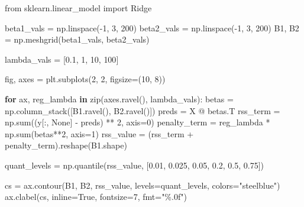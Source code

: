 \documentclass[
  letterpaper,
  DIV=11,
  numbers=noendperiod]{scrreprt}
\newenvironment{Shaded}{\begin{snugshade}}{\end{snugshade}}
\newcommand{\BuiltInTok}[1]{\textcolor[rgb]{0.00,0.23,0.31}{#1}}
\newcommand{\ControlFlowTok}[1]{\textcolor[rgb]{0.00,0.23,0.31}{\textbf{#1}}}
\newcommand{\DecValTok}[1]{\textcolor[rgb]{0.68,0.00,0.00}{#1}}
\newcommand{\FloatTok}[1]{\textcolor[rgb]{0.68,0.00,0.00}{#1}}
\newcommand{\ImportTok}[1]{\textcolor[rgb]{0.00,0.46,0.62}{#1}}
\newcommand{\KeywordTok}[1]{\textcolor[rgb]{0.00,0.23,0.31}{\textbf{#1}}}
\newcommand{\NormalTok}[1]{\textcolor[rgb]{0.00,0.23,0.31}{#1}}
\newcommand{\OperatorTok}[1]{\textcolor[rgb]{0.37,0.37,0.37}{#1}}
\newcommand{\StringTok}[1]{\textcolor[rgb]{0.13,0.47,0.30}{#1}}
\newcommand{\VariableTok}[1]{\textcolor[rgb]{0.07,0.07,0.07}{#1}}
\theoremstyle{definition}
\theoremstyle{definition}
\theoremstyle{plain}
\theoremstyle{plain}
\theoremstyle{remark}
\begin{document}
\begin{Shaded}
\begin{Highlighting}[]
\ImportTok{from}\NormalTok{ sklearn.linear\_model }\ImportTok{import}\NormalTok{ Ridge}

\NormalTok{beta1\_vals }\OperatorTok{=}\NormalTok{ np.linspace(}\OperatorTok{{-}}\DecValTok{1}\NormalTok{, }\DecValTok{3}\NormalTok{, }\DecValTok{200}\NormalTok{)}
\NormalTok{beta2\_vals }\OperatorTok{=}\NormalTok{ np.linspace(}\OperatorTok{{-}}\DecValTok{1}\NormalTok{, }\DecValTok{3}\NormalTok{, }\DecValTok{200}\NormalTok{)}
\NormalTok{B1, B2 }\OperatorTok{=}\NormalTok{ np.meshgrid(beta1\_vals, beta2\_vals)}

\NormalTok{lambda\_vals }\OperatorTok{=}\NormalTok{ [}\FloatTok{0.1}\NormalTok{, }\DecValTok{1}\NormalTok{, }\DecValTok{10}\NormalTok{, }\DecValTok{100}\NormalTok{]}


\NormalTok{fig, axes }\OperatorTok{=}\NormalTok{ plt.subplots(}\DecValTok{2}\NormalTok{, }\DecValTok{2}\NormalTok{, figsize}\OperatorTok{=}\NormalTok{(}\DecValTok{10}\NormalTok{, }\DecValTok{8}\NormalTok{))}

\ControlFlowTok{for}\NormalTok{ ax, reg\_lambda }\KeywordTok{in} \BuiltInTok{zip}\NormalTok{(axes.ravel(), lambda\_vals):}
\NormalTok{    betas }\OperatorTok{=}\NormalTok{ np.column\_stack([B1.ravel(), B2.ravel()])}
\NormalTok{    preds }\OperatorTok{=}\NormalTok{ X }\OperatorTok{@}\NormalTok{ betas.T}
\NormalTok{    rss\_term }\OperatorTok{=}\NormalTok{ np.}\BuiltInTok{sum}\NormalTok{((y[:, }\VariableTok{None}\NormalTok{] }\OperatorTok{{-}}\NormalTok{ preds) }\OperatorTok{**} \DecValTok{2}\NormalTok{, axis}\OperatorTok{=}\DecValTok{0}\NormalTok{)}
\NormalTok{    penalty\_term }\OperatorTok{=}\NormalTok{ reg\_lambda }\OperatorTok{*}\NormalTok{ np.}\BuiltInTok{sum}\NormalTok{(betas}\OperatorTok{**}\DecValTok{2}\NormalTok{, axis}\OperatorTok{=}\DecValTok{1}\NormalTok{)}
\NormalTok{    rss\_value }\OperatorTok{=}\NormalTok{ (rss\_term }\OperatorTok{+}\NormalTok{ penalty\_term).reshape(B1.shape)}

\NormalTok{    quant\_levels }\OperatorTok{=}\NormalTok{ np.quantile(rss\_value, [}\FloatTok{0.01}\NormalTok{, }\FloatTok{0.025}\NormalTok{, }\FloatTok{0.05}\NormalTok{, }\FloatTok{0.2}\NormalTok{, }\FloatTok{0.5}\NormalTok{, }\FloatTok{0.75}\NormalTok{])}

\NormalTok{    cs }\OperatorTok{=}\NormalTok{ ax.contour(B1, B2, rss\_value, levels}\OperatorTok{=}\NormalTok{quant\_levels, colors}\OperatorTok{=}\StringTok{"steelblue"}\NormalTok{)}
\NormalTok{    ax.clabel(cs, inline}\OperatorTok{=}\VariableTok{True}\NormalTok{, fontsize}\OperatorTok{=}\DecValTok{7}\NormalTok{, fmt}\OperatorTok{=}\StringTok{"\%.0f"}\NormalTok{)}


\end{Highlighting}
\end{Shaded}
\end{document}
